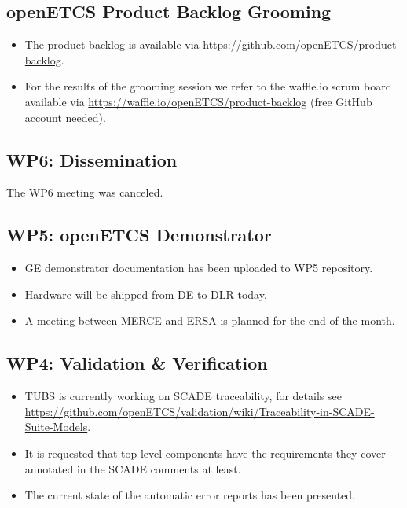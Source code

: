 \documentclass[a4paper, 11pt]{article}
\begin{document}
\subsection{openETCS Product Backlog Grooming}
\begin{itemize}
\item The product backlog is available via 
\url{https://github.com/openETCS/product-backlog}. 
\item For the results of the grooming session we refer to the waffle.io scrum board available via \url{https://waffle.io/openETCS/product-backlog} (free GitHub account needed).

\end{itemize}

\subsection{WP6: Dissemination}

The WP6 meeting was canceled.
 
\subsection{WP5: openETCS Demonstrator}

\begin{itemize}
\item GE demonstrator documentation has been uploaded to WP5 repository.
\item Hardware will be shipped from DE to DLR today.
\item A meeting between MERCE and ERSA is planned for the end of the month.
\end{itemize}

\subsection{WP4: Validation \& Verification}
\begin{itemize}
\item TUBS is currently working on SCADE traceability, for details see \url{https://github.com/openETCS/validation/wiki/Traceability-in-SCADE-Suite-Models}.\
\item It is requested that top-level components have the requirements they cover annotated in the SCADE comments at least.
\item The current state of the automatic error reports has been presented.
\end{itemize}
\end{document}
